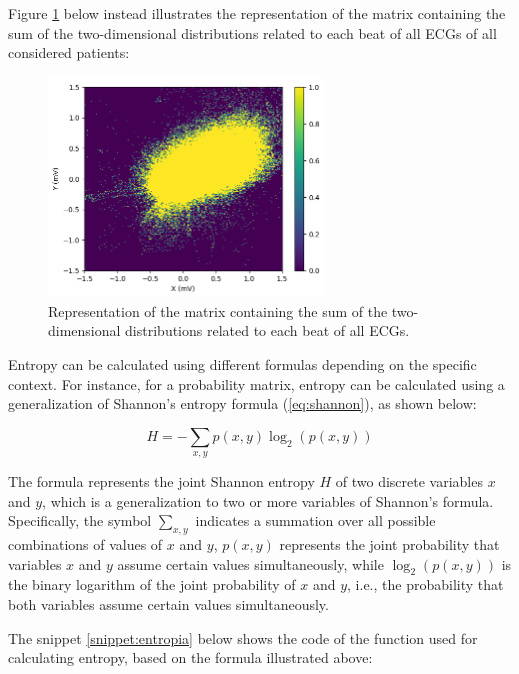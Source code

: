 \documentclass[12pt,italian]{report}
\begin{document}
Figure \ref{fig:each_beat_all_ecg} below instead illustrates the representation of the matrix containing the sum of the two-dimensional distributions related to each beat of all ECGs of all considered patients:

\begin{figure}[H]
    \centering
    \includegraphics[width=0.65\textwidth]{images/each_beat_all_ecg.png}
    \captionsetup{justification=centering}
    \caption{Representation of the matrix containing the sum of the two-dimensional distributions related to each beat of all ECGs.}
    \label{fig:each_beat_all_ecg}
\end{figure}

Entropy can be calculated using different formulas depending on the specific context. For instance, for a probability matrix, entropy can be calculated using a generalization of Shannon's entropy formula (\ref{eq:shannon}), as shown below:

\begin{equation}
    H = - \sum_{x,y} p(x,y) \log_2(p(x,y))
    \label{eq:shannon}
\end{equation}

The formula represents the joint Shannon entropy $ H $ of two discrete variables $ x $ and $ y $, which is a generalization to two or more variables of Shannon's formula. Specifically, the symbol $ \sum_{x,y} $ indicates a summation over all possible combinations of values of $ x $ and $ y $, $ p(x,y) $ represents the joint probability that variables $ x $ and $ y $ assume certain values simultaneously, while $ \log_2(p(x,y)) $ is the binary logarithm of the joint probability of $ x $ and $ y $, i.e., the probability that both variables assume certain values simultaneously.

The snippet \ref{snippet:entropia} below shows the code of the function used for calculating entropy, based on the formula illustrated above:
\end{document}
